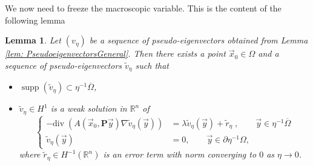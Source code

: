 \documentclass[a4paper,reqno]{amsart}
\numberwithin{equation}{section}
\numberwithin{equation}{section}		%
\numberwithin{figure}{section}			%
\numberwithin{table}{section}				%
\newtheorem{lemma}[theorem]{Lemma}
\theoremstyle{definition}
\renewcommand{\tilde}{\widetilde}
\renewcommand{\bar}[1]{\overline{#1}}
\newcommand{\<}{\ensuremath \leq}
\renewcommand{\>}{\ensuremath \geq}
\renewcommand{\tilde}{\widetilde}
\begin{document}
We now need to freeze the macroscopic variable. This is the content of the following lemma
\begin{lemma}\label{lem: FrozenCoefficients}
    Let $(v_\eta)$ be a sequence of pseudo-eigenvectors obtained from Lemma \ref{lem: PseudoeigenvectorsGeneral}. Then there exists a point $\vec x_0\in \Omega$ and a sequence of pseudo-eigenvectors $\tilde{v}_\eta$ such that
    \begin{itemize}
        \item $\operatorname{supp}(\tilde{v}_\eta)\subset\eta^{-1}\bar{\Omega}$,
        \item $\tilde{v}_\eta\in H^1$ is a weak solution in $\mathbb{R}^n$ of 
         \begin{equation} 
            \left\{
                \begin{aligned}
                    - \mathrm{div} \; \left( A\left( \vec{x}_0, \textbf{P} \vec{y} \right) \nabla \tilde{v}_\eta({\vec y}) \right )& = \lambda \tilde{v}_\eta(\vec{y})+\tilde{r}_\eta \;, \qquad \vec{y} \in \eta^{-1}\bar{\Omega} \\
                    \tilde{v}_\eta(\vec{y})& = 0,\qquad \vec{y}\in\partial\eta^{-1}\Omega,
                \end{aligned}
            \right.
        \end{equation}
        where $\tilde{r}_\eta\in H^{-1}(\mathbb{R}^n)$ is  an error term with norm converging to $0$ as $\eta\to0$.
    \end{itemize}
\end{lemma}
\end{document}
